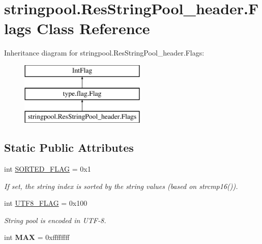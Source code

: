 \hypertarget{classstringpool_1_1ResStringPool__header_1_1Flags}{}\section{stringpool.\+Res\+String\+Pool\+\_\+header.\+Flags Class Reference}
\label{classstringpool_1_1ResStringPool__header_1_1Flags}
Inheritance diagram for stringpool.\+Res\+String\+Pool\+\_\+header.\+Flags\+:\begin{figure}[H]
\begin{center}
\leavevmode
\includegraphics[height=3.000000cm]{classstringpool_1_1ResStringPool__header_1_1Flags}
\end{center}
\end{figure}
\subsection*{Static Public Attributes}
\begin{DoxyCompactItemize}
\item 
int \mbox{\hyperlink{classstringpool_1_1ResStringPool__header_1_1Flags_a68b1dadda5f1de1ea95e36188bc09416}{S\+O\+R\+T\+E\+D\+\_\+\+F\+L\+AG}} = 0x1
\begin{DoxyCompactList}\small\item\em If set, the string index is sorted by the string values (based on strcmp16()). \end{DoxyCompactList}\item 
\mbox{\label{classstringpool_1_1ResStringPool__header_1_1Flags_a82256f23260b0feaf0c40eb2e30fa5a8}} 
int \mbox{\hyperlink{classstringpool_1_1ResStringPool__header_1_1Flags_a82256f23260b0feaf0c40eb2e30fa5a8}{U\+T\+F8\+\_\+\+F\+L\+AG}} = 0x100
\begin{DoxyCompactList}\small\item\em String pool is encoded in U\+T\+F-\/8. \end{DoxyCompactList}\item 
\mbox{\label{classstringpool_1_1ResStringPool__header_1_1Flags_acd477e16311fa70b268b4a763edb0cb5}} 
int {\bfseries M\+AX} = 0xffffffff
\end{DoxyCompactItemize}
